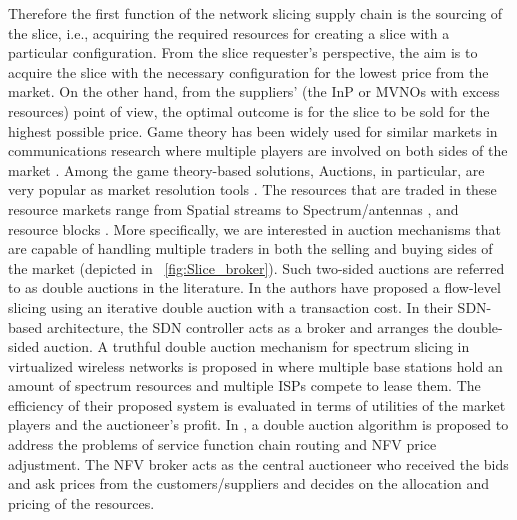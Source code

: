 Therefore the first function of the network slicing supply chain is the sourcing of the slice, i.e., acquiring the required resources for creating a slice with a particular configuration. From the slice requester's perspective, the aim is to acquire the slice with the necessary configuration for the lowest price from the market. On the other hand, from the suppliers' (the \ac{InP} or \acp{MVNO} with excess resources) point of view, the optimal outcome is for the slice to be sold for the highest possible price. Game theory has been widely used for similar markets in communications research where multiple players are involved on both sides of the market \cite{CHARILAS20103421}. Among the game theory-based solutions, Auctions, in particular, are very popular as market resolution tools \cite{8480631}. The resources that are traded in these resource markets range from Spatial streams \cite{7842378} to Spectrum/antennas \cite{7600959}, and resource blocks \cite{resource_blocks_auction}.
More specifically, we are interested in auction mechanisms that are capable of handling multiple traders in both the selling and buying sides of the market (depicted in \figureautorefname~\ref{fig:Slice_broker}). Such two-sided auctions are referred to as double auctions in the literature.
In \cite{7794896} the authors have proposed a flow-level slicing using an iterative double auction with a transaction cost. In their SDN-based architecture, the SDN controller acts as a broker and arranges the double-sided auction. 
A truthful double auction mechanism for spectrum slicing in virtualized wireless networks is proposed in \cite{ei2017game} where multiple base stations hold an amount of spectrum resources and multiple \acp{ISP} compete to lease them. The efficiency of their proposed system is evaluated in terms of utilities of the market players and the auctioneer's profit. 
In \cite{8542782}, a double auction algorithm is proposed to address the problems of service function chain routing and NFV price adjustment. The NFV broker acts as the central auctioneer who received the bids and ask prices from the customers/suppliers and decides on the allocation and pricing of the resources.

